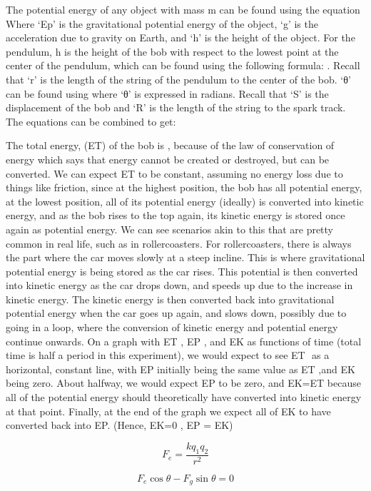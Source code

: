 \documentclass{article}
\begin{document}
The potential energy of any object with mass m can be found using the equation
Where ‘Ep’ is the gravitational potential energy of the object, ‘g’ is the acceleration due to gravity on Earth, and ‘h’ is the height of the object. For the pendulum, h is the height of the bob with respect to the lowest point at the center of the pendulum, which can be found using the following formula:
. Recall that ‘r’ is the length of the string of the pendulum to the center of the bob. ‘θ’ can be found using  where ‘θ’ is expressed in radians. Recall that ‘S’ is the displacement of the bob and ‘R’ is the length of the string to the spark track.  The equations can be combined to get:


The total energy, (ET) of the bob is  , because of the law of conservation of energy which says that energy cannot be created or destroyed, but can be converted. We can expect ET to be constant, assuming no energy loss due to things like friction, since at the highest position, the bob has all potential energy, at the lowest position, all of its potential energy (ideally) is converted into kinetic energy, and as the bob rises to the top again, its kinetic energy is stored once again as potential energy. We can see scenarios akin to this that are pretty common in real life, such as in rollercoasters.  For rollercoasters, there is always the part where the car moves slowly at a steep incline. This is where gravitational potential energy is being stored as the car rises. This potential is then converted into kinetic energy as the car drops down, and speeds up due to the increase in kinetic energy. The kinetic energy is then converted back into gravitational potential energy when the car goes up again, and slows down, possibly due to going in a loop, where the conversion of kinetic energy and potential energy continue onwards.
On a graph with ET , EP , and EK  as functions of time (total time is half a period in this experiment), we would expect to see ET ­ as a horizontal, constant line, with EP initially being the same value as ET ,and EK being zero. About halfway, we would expect EP to be zero, and EK=ET because all of the potential energy should theoretically have converted into kinetic energy at that point. Finally, at the end of the graph we expect all of EK­ to have converted back into EP. (Hence, EK=0 , EP = EK)

  \begin{equation}
    F_e=\frac{k q_1 q_2}{r^2}
  \end{equation}

  \begin{equation}
    F_e \cos\theta - F_g \sin\theta=0
  \end{equation}
\end{document}
